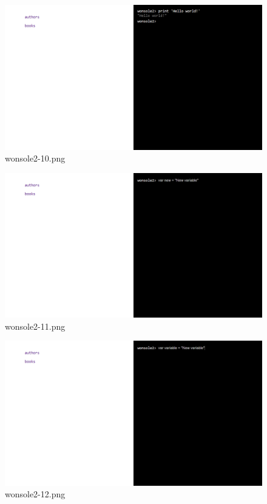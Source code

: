 \begin{figure}
\includegraphics[width=\textwidth]{screenshot/wonsole2/wonsole2-10.png}
\caption{wonsole2-10.png}
\label{wonsole2-10.png}
\end{figure}


\clearpage
\begin{figure}
\includegraphics[width=\textwidth]{screenshot/wonsole2/wonsole2-11.png}
\caption{wonsole2-11.png}
\label{wonsole2-11.png}
\end{figure}


\begin{figure}
\includegraphics[width=\textwidth]{screenshot/wonsole2/wonsole2-12.png}
\caption{wonsole2-12.png}
\label{wonsole2-12.png}
\end{figure}



